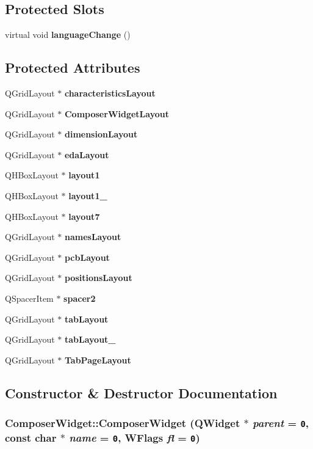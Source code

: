 \subsection*{Protected Slots}
\begin{CompactItemize}
\item 
virtual void {\bf language\-Change} ()
\end{CompactItemize}
\subsection*{Protected Attributes}
\begin{CompactItemize}
\item 
QGrid\-Layout $\ast$ {\bf characteristics\-Layout}
\item 
QGrid\-Layout $\ast$ {\bf Composer\-Widget\-Layout}
\item 
QGrid\-Layout $\ast$ {\bf dimension\-Layout}
\item 
QGrid\-Layout $\ast$ {\bf eda\-Layout}
\item 
QHBox\-Layout $\ast$ {\bf layout1}
\item 
QHBox\-Layout $\ast$ {\bf layout1\_}
\item 
QHBox\-Layout $\ast$ {\bf layout7}
\item 
QGrid\-Layout $\ast$ {\bf names\-Layout}
\item 
QGrid\-Layout $\ast$ {\bf pcb\-Layout}
\item 
QGrid\-Layout $\ast$ {\bf positions\-Layout}
\item 
QSpacer\-Item $\ast$ {\bf spacer2}
\item 
QGrid\-Layout $\ast$ {\bf tab\-Layout}
\item 
QGrid\-Layout $\ast$ {\bf tab\-Layout\_}
\item 
QGrid\-Layout $\ast$ {\bf Tab\-Page\-Layout}
\end{CompactItemize}


\subsection{Constructor \& Destructor Documentation}
\subsubsection{\setlength{\rightskip}{0pt plus 5cm}Composer\-Widget::Composer\-Widget (QWidget $\ast$ {\em parent} = {\tt 0}, const char $\ast$ {\em name} = {\tt 0}, WFlags {\em fl} = {\tt 0})}\label{classComposerWidget_3cb0fbb1aa2f045f4ea1c1060cfc7ca1}


